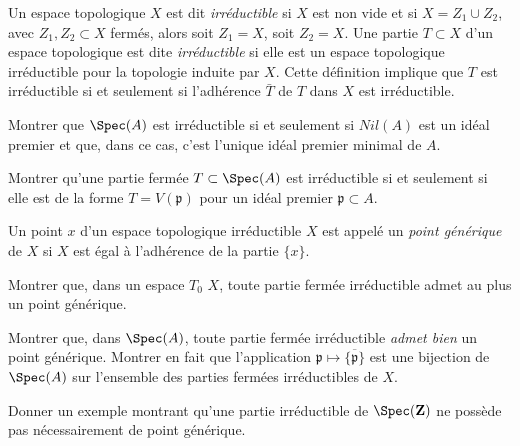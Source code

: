 \begin{definition}
\label{definition-irreducible}
Un espace topologique $X$ est dit {\it irréductible} si $X$ est non vide
et si $X = Z_1\cup Z_2$, avec $Z_1, Z_2\subset X$ fermés, alors soit
$Z_1 = X$, soit $Z_2 = X$. Une partie $T\subset X$ d'un espace topologique
est dite {\it irréductible} si elle est un espace topologique
irréductible pour la topologie induite par $X$.
Cette définition implique que $T$ est irréductible si et seulement
si l'adhérence $\bar T$ de $T$ dans $X$ est irréductible.
\end{definition}

\begin{exercise}
\label{exercise-irreducible-spec}
Montrer que $\Spec(A)$ est irréductible si et seulement si
$Nil(A)$ est un idéal premier et que, dans ce cas, c'est l'unique
idéal premier minimal de $A$.
\end{exercise}

\begin{exercise}
\label{exercise-irreducible-prime}
Montrer qu'une partie fermée $T\subset \Spec(A)$
est irréductible si et seulement si elle est de la forme $T = V({\mathfrak p})$ pour
un idéal premier ${\mathfrak p}\subset A$.
\end{exercise}

\begin{definition}
\label{definition-generic-point}
Un point $x$ d'un espace topologique irréductible $X$ est appelé
un {\it point générique} de $X$ si $X$ est égal à l'adhérence de
la partie $\{x\}$.
\end{definition}

\begin{exercise}
\label{exercise-irreducible-T0-at-most-one-generic}
Montrer que, dans un espace $T_0$ $X$, toute partie fermée
irréductible admet au plus un point générique.
\end{exercise}

\begin{exercise}
\label{exercise-spec-sober}
Montrer que, dans $\Spec(A)$, toute
partie fermée irréductible {\it admet bien} un point générique.
Montrer en fait que l'application
${\mathfrak p} \mapsto \overline{\{{\mathfrak p}\}}$ est
une bijection de $\Spec(A)$ sur l'ensemble des parties fermées
irréductibles de $X$.
\end{exercise}

\begin{exercise}
\label{exercise-irreducible-subset-not-generic}
Donner un exemple montrant qu'une partie irréductible de
$\Spec(\mathbf{Z})$ ne possède pas nécessairement de point générique.
\end{exercise}

